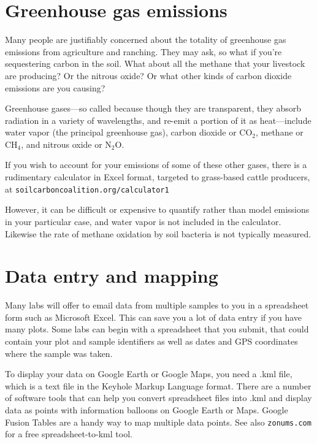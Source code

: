 \documentclass[11pt,letterpaper,oneside,onecolumn]{memoir}
\begin{document}
\section{Greenhouse gas emissions}

Many people are justifiably concerned about the totality of greenhouse gas emissions from agriculture and ranching. They may ask, so what if you're sequestering carbon in the soil. What about all the methane that your livestock are producing? Or the nitrous oxide? Or what other kinds of carbon dioxide emissions are you causing?

Greenhouse gases---so called because though they are transparent, they absorb radiation in a variety of wavelengths, and re-emit a portion of it as heat---include water vapor (the principal greenhouse gas), carbon dioxide or CO$_{2}$, methane or CH$_{4}$, and nitrous oxide or N$_{2}$O.

If you wish to account for your emissions of some of these other gases, there is a rudimentary calculator in Excel format, targeted to grass-based cattle producers, at \texttt{soilcarboncoalition.org/calculator1}

However, it can be difficult or expensive to quantify rather than model emissions in your particular case, and water vapor is not included in the calculator. Likewise the rate of methane oxidation by soil bacteria is not typically measured.


\section{Data entry and mapping}

Many labs will offer to email data from multiple samples to you in a spreadsheet form such as Microsoft Excel. This can save you a lot of data entry if you have many plots. Some labs can begin with a spreadsheet that you submit, that could contain your plot and sample identifiers as well as dates and GPS coordinates where the sample was taken.

To display your data on Google Earth or Google Maps, you need a .kml file, which is a text file in the Keyhole Markup Language format. There are a number of software tools that can help you convert spreadsheet files into .kml and display data as points with information balloons on Google Earth or Maps. Google Fusion Tables are a handy way to map multiple data points. See also \texttt{zonums.com} for a free spreadsheet-to-kml tool.
\end{document}
